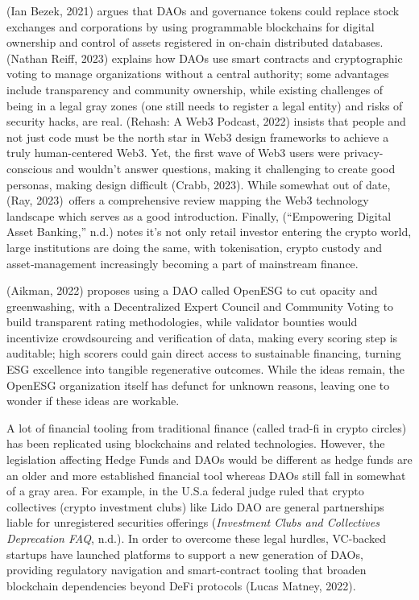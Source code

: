 \documentclass[
  12pt,
  letterpaper,
  DIV=11,
  numbers=noendperiod]{scrartcl}
\begin{document}
(Ian Bezek, 2021) argues that DAOs and governance tokens could replace
stock exchanges and corporations by using programmable blockchains for
digital ownership and control of assets registered in on-chain
distributed databases. (Nathan Reiff, 2023) explains how DAOs use smart
contracts and cryptographic voting to manage organizations without a
central authority; some advantages include transparency and community
ownership, while existing challenges of being in a legal gray zones (one
still needs to register a legal entity) and risks of security hacks, are
real. (Rehash: A Web3 Podcast, 2022) insists that people and not just
code must be the north star in Web3 design frameworks to achieve a truly
human-centered Web3. Yet, the first wave of Web3 users were
privacy-conscious and wouldn't answer questions, making it challenging
to create good personas, making design difficult (Crabb, 2023). While
somewhat out of date, (Ray, 2023)~offers a comprehensive review mapping
the Web3 technology landscape which serves as a good introduction.
Finally, ({``Empowering {Digital Asset Banking},''} n.d.) notes it's not
only retail investor entering the crypto world, large institutions are
doing the same, with tokenisation, crypto custody and asset‑management
increasingly becoming a part of mainstream finance.

(Aikman, 2022) proposes using a DAO called OpenESG to cut opacity and
greenwashing, with a Decentralized Expert Council and Community Voting
to build transparent rating methodologies, while validator bounties
would incentivize crowdsourcing and verification of data, making every
scoring step is auditable; high scorers could gain direct access to
sustainable financing, turning ESG excellence into tangible regenerative
outcomes. While the ideas remain, the OpenESG organization itself has
defunct for unknown reasons, leaving one to wonder if these ideas are
workable.

A lot of financial tooling from traditional finance (called trad-fi in
crypto circles) has been replicated using blockchains and related
technologies. However, the legislation affecting Hedge Funds and DAOs
would be different as hedge funds are an older and more established
financial tool whereas DAOs still fall in somewhat of a gray area. For
example, in the U.S.a federal judge ruled that crypto collectives
(crypto investment clubs) like Lido DAO are general partnerships liable
for unregistered securities offerings (\emph{Investment {Clubs} and
{Collectives} {\textbar} {Deprecation FAQ}}, n.d.). In order to overcome
these legal hurdles, VC-backed startups have launched platforms to
support a new generation of DAOs, providing regulatory navigation and
smart-contract tooling that broaden blockchain dependencies beyond DeFi
protocols (Lucas Matney, 2022).
\end{document}
